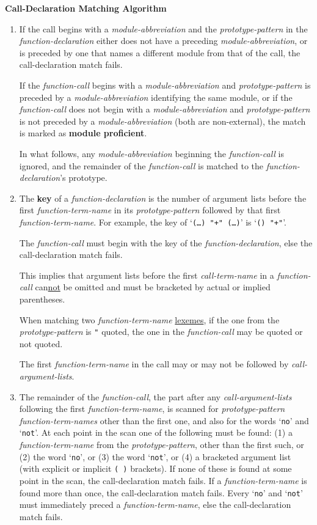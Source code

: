 \documentclass[12pt]{article}
\newcommand{\key}[1]{{\rm \bfseries #1}}
\begin{document}
\centerline{\bf Call-Declaration Matching Algorithm}
\begin{enumerate}
\item\label{CALL-DECLARATION-MODULE-ABBREVIATION}
If the call begins with a {\em module-abbreviation}
and the {\em prototype-pattern} in the {\em function-declaration}
either does not have a preceding {\em module-abbreviation},
or is preceded by one that names a different module from that of the call,
the call-declaration match fails.

If the {\em function-call} begins with a {\em module-abbreviation}
and {\em prototype-pattern} is preceded by a {\em module-abbreviation}
identifying the same module, or
if the {\em function-call} does not begin with a {\em module-abbreviation}
and {\em prototype-pattern} is not preceded by a {\em module-abbreviation}
(both are non-external),
the match is marked as \key{module proficient}\label{MODULE-PROFICIENT}.

In what follows, any {\em module-abbreviation} beginning the
{\em function-call} is ignored, and the remainder of the {\em function-call}
is matched to the {\em function-declaration}'s prototype.

\item\label{CALL-DECLARATION-KEY}
The \key{key} of a {\em function-declaration}
is the number of argument lists before
the first {\em function-term-name} in its {\em prototype-pattern}
followed by that first
{\em function-term-name}.  For example, the key of
`{\tt (\ldots) "+" (\ldots)}' is `{\tt () "+"}'.

The {\em function-call} must begin with the key of the
{\em function-declaration}, else the call-declaration match fails.

This implies that argument lists before the first {\em call-term-name}
in a {\em function-call} can\underline{not} be omitted and must be bracketed
by actual or implied parentheses.

When matching two {\em function-term-name} \underline{lexemes}, if the one from
the {\em prototype-pattern} is {\tt "} quoted, the
one in the {\em function-call} may be quoted or not quoted.

The first {\em function-term-name} in the call may or may not be followed by
{\em call-argument-lists}.


\item\label{CALL-DECLARATION-TERM-NAMES}
The remainder of the {\em function-call}, the part after any
{\em call-argument-lists} following the first {\em function-term-name},
is scanned for {\em prototype-pattern}
{\em function-term-names} other than the first one, and also for
the words `{\tt no}' and `{\tt not}'.  At each point in the scan
one of the following must be found: (1) a {\em function-term-name} from
the {\em prototype-pattern}, other than the first such, or
(2) the word `{\tt no}', or (3) the word `{\tt not}', or
(4) a bracketed argument list (with explicit or
implicit {\tt (~)} brackets).
If none of these is found at some point in the scan,
the call-declaration match fails.  If a {\em function-term-name} is
found more than once, the call-declaration match fails.
Every `{\tt no}' and `{\tt not}' must immediately preced a
{\em function-term-name}, else the call-declaration match fails.


\end{enumerate}
\end{document}
